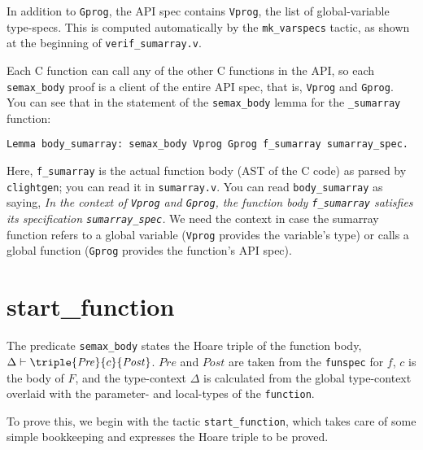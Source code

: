 \documentclass[12pt,fleqn,openany,oneside,showtrims]{memoir}
\begin{document}
In addition to \lstinline{Gprog},
the API spec contains \lstinline{Vprog}, the list of
global-variable type-specs.  This is computed automatically
by the \lstinline{mk_varspecs} tactic, as shown at the
beginning of \lstinline{verif_sumarray.v}.

Each C function can call any of the other C functions
in the API, so each \lstinline{semax_body} proof
is a client of the entire API spec, that is,
\lstinline{Vprog} and \lstinline{Gprog}.
You can see that in the statement of the
\lstinline{semax_body} lemma for the \lstinline{_sumarray}
function:
\begin{lstlisting}
Lemma body_sumarray: semax_body Vprog Gprog f_sumarray sumarray_spec.
\end{lstlisting}
Here, \lstinline{f_sumarray} is the actual function body
(AST of the C code) as parsed by \lstinline{clightgen};
you can read it in \lstinline{sumarray.v}.
You can read \lstinline{body_sumarray} as saying,
\emph{In the context of \lstinline{Vprog} and \lstinline{Gprog},
  the function body \lstinline{f_sumarray}
  satisfies its specification \lstinline{sumarray_spec}.}
We need the context in case the sumarray function
refers to a global variable (\lstinline{Vprog} provides
the variable's type)
or calls a global function
 (\lstinline{Gprog} provides
the function's API spec).

\chapter{\upshape\textsf{start\_function}}
\label{refcard:start-function}
The predicate \lstinline{semax_body}
states the Hoare triple of the function body,
$\Delta\vdash \triple{\mathit{Pre}}{c}{\mathit{Post}}$.
$\mathit{Pre}$ and $\mathit{Post}$ are taken from the \lstinline{funspec}
for $f$, $c$ is the body of $F$,
and the type-context $\Delta$ is calculated from the global type-context
overlaid with the parameter- and local-types of the  \lstinline{function}.

To prove this, we begin with the tactic \lstinline{start_function},
which takes care of some simple bookkeeping and
expresses the Hoare triple to be proved.
\end{document}
